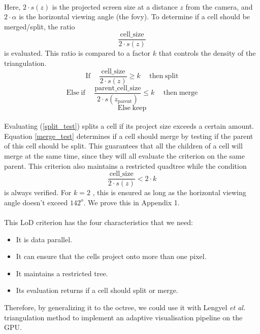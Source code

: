 \paragraph{}
Here, $2 \cdot s(z)$ is the projected screen size at a distance $z$ from the camera, and $2\cdot\alpha$ is the horizontal viewing angle (the fovy). 
To determine if a cell should be merged/split, the ratio $$\frac{\mathrm{cell\_size}}{2 \cdot s(z)}$$ is evaluated.
This ratio is compared to a factor $k$ that controls the density of the triangulation.\\
\begin{equation}
\mathrm{If} \hspace{15pt} \frac{\mathrm{cell\_size}}{2 \cdot s(z)} \geq k \hspace{15pt} \mathrm{then} \hspace{3pt} \mathrm{split}
\label{split_test}
\end{equation}
\begin{equation}
\mathrm{Else} \hspace{3pt} \mathrm{if} \hspace{15pt} \frac{\mathrm{parent\_cell\_size}}{2 \cdot s(z_{\mathrm{parent}})} \leq k \hspace{15pt} \mathrm{then} \hspace{3pt} \mathrm{merge}
\label{merge_test}
\end{equation}
\begin{equation*}
\mathrm{Else} \hspace{3pt} \mathrm{keep}
\end{equation*}
\paragraph{}
Evaluating (\ref{split_test}) splits a cell if its project size exceeds a certain amount.
Equation \ref{merge_test} determines if a cell should merge by testing if the parent of this cell should be split.
This guarantees that all the children of a cell will merge at the same time, since they will all evaluate the criterion on the same parent.
This criterion also maintains a restricted quadtree while the condition $$\frac{\mathrm{cell\_size}}{2 \cdot s(z)} < 2 \cdot k $$ is always verified.
For $k = 2$ , this is ensured as long as the horizontal viewing angle doesn't exceed $142^o$.
We prove this in Appendix 1.

\paragraph{}
This LoD criterion has the four characteristics that we need:
\begin{itemize}
	\item It is data parallel.
	\item It can ensure that the cells project onto more than one pixel.
	\item It maintains a restricted tree.
	\item Its evaluation returns if a cell should split or merge.
\end{itemize}
Therefore, by generalizing it to the octree, we could use it with Lengyel \textit{et al.} triangulation method to implement an adaptive visualisation pipeline on the GPU.
